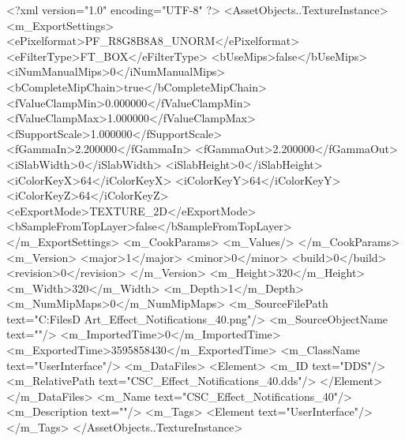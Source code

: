<?xml version="1.0" encoding="UTF-8" ?>
<AssetObjects..TextureInstance>
	<m_ExportSettings>
		<ePixelformat>PF_R8G8B8A8_UNORM</ePixelformat>
		<eFilterType>FT_BOX</eFilterType>
		<bUseMips>false</bUseMips>
		<iNumManualMips>0</iNumManualMips>
		<bCompleteMipChain>true</bCompleteMipChain>
		<fValueClampMin>0.000000</fValueClampMin>
		<fValueClampMax>1.000000</fValueClampMax>
		<fSupportScale>1.000000</fSupportScale>
		<fGammaIn>2.200000</fGammaIn>
		<fGammaOut>2.200000</fGammaOut>
		<iSlabWidth>0</iSlabWidth>
		<iSlabHeight>0</iSlabHeight>
		<iColorKeyX>64</iColorKeyX>
		<iColorKeyY>64</iColorKeyY>
		<iColorKeyZ>64</iColorKeyZ>
		<eExportMode>TEXTURE_2D</eExportMode>
		<bSampleFromTopLayer>false</bSampleFromTopLayer>
	</m_ExportSettings>
	<m_CookParams>
		<m_Values/>
	</m_CookParams>
	<m_Version>
		<major>1</major>
		<minor>0</minor>
		<build>0</build>
		<revision>0</revision>
	</m_Version>
	<m_Height>320</m_Height>
	<m_Width>320</m_Width>
	<m_Depth>1</m_Depth>
	<m_NumMipMaps>0</m_NumMipMaps>
	<m_SourceFilePath text="C:\Users\Shadow\Desktop\Working Files\2D Art\Effects\CSC_Effect_Notifications_40.png"/>
	<m_SourceObjectName text=""/>
	<m_ImportedTime>0</m_ImportedTime>
	<m_ExportedTime>3595858430</m_ExportedTime>
	<m_ClassName text="UserInterface"/>
	<m_DataFiles>
		<Element>
			<m_ID text="DDS"/>
			<m_RelativePath text="CSC_Effect_Notifications_40.dds"/>
		</Element>
	</m_DataFiles>
	<m_Name text="CSC_Effect_Notifications_40"/>
	<m_Description text=""/>
	<m_Tags>
		<Element text="UserInterface"/>
	</m_Tags>
</AssetObjects..TextureInstance>

